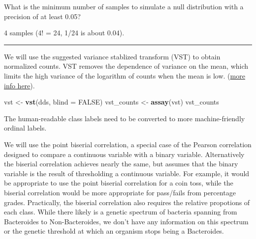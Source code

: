 \documentclass[
]{book}
\newenvironment{Shaded}{\begin{snugshade}}{\end{snugshade}}
\newcommand{\AttributeTok}[1]{\textcolor[rgb]{0.13,0.29,0.53}{#1}}
\newcommand{\ConstantTok}[1]{\textcolor[rgb]{0.56,0.35,0.01}{#1}}
\newcommand{\DecValTok}[1]{\textcolor[rgb]{0.00,0.00,0.81}{#1}}
\newcommand{\FunctionTok}[1]{\textcolor[rgb]{0.13,0.29,0.53}{\textbf{#1}}}
\newcommand{\NormalTok}[1]{#1}
\newcommand{\OtherTok}[1]{\textcolor[rgb]{0.56,0.35,0.01}{#1}}
\newcommand{\SpecialCharTok}[1]{\textcolor[rgb]{0.81,0.36,0.00}{\textbf{#1}}}
\begin{document}
What is the minimum number of samples to simulate a null distribution with a precision of at least 0.05?

4 samples (4! = 24, 1/24 is about 0.04).

\begin{center}\rule{0.5\linewidth}{0.5pt}\end{center}

We will use the suggested variance stablized transform (VST) to obtain normalized counts. VST removes the dependence of variance on the mean,
which limits the high variance of the logarithm of counts when the mean is low.
(\href{https://bioconductor.org/packages/devel/bioc/vignettes/DESeq2/inst/doc/DESeq2.html\#:~:text=transformations\%20and\%20visualization-,Count\%20data\%20transformations,-In\%20order\%20to}{more info here}).

\begin{Shaded}
\begin{Highlighting}[numbers=left,,]
\NormalTok{vst }\OtherTok{\textless{}{-}} \FunctionTok{vst}\NormalTok{(dds, }\AttributeTok{blind =} \ConstantTok{FALSE}\NormalTok{)}
\NormalTok{vst\_counts }\OtherTok{\textless{}{-}} \FunctionTok{assay}\NormalTok{(vst)}
\NormalTok{vst\_counts}
\end{Highlighting}
\end{Shaded}

The human-readable class labels need to be converted to more machine-friendly ordinal labels.

\begin{Shaded}
\end{Shaded}

We will use the point biserial correlation, a special case of the Pearson correlation designed to compare a continuous variable with a binary variable.
Alternatively the biserial correlation achieves nearly the same, but assumes that the binary variable is the result of thresholding a continuous variable.
For example, it would be appropriate to use the point biserial correlation for a coin toss, while the biserial correlation would be more appropriate for pass/fails from percentage grades.
Practically, the biserial correlation also requires the relative propotions of each class. While there likely is a genetic spectrum of bacteria spanning
from Bacteroides to Non-Bacteroides, we don't have any information on this spectrum or the genetic threshold at which an organism stops being a Bacteroides.
\end{document}
